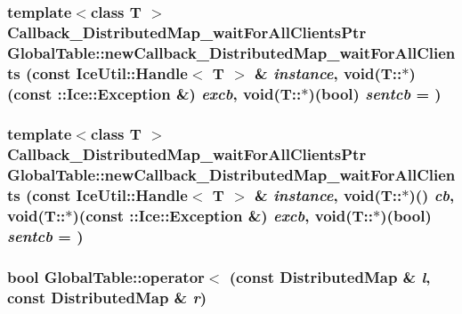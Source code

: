 \label{namespace_global_table_ac9ffe632ea55c9e7441c89ffc0d325c8}
\hypertarget{namespace_global_table_a7934bc48a6767947eeee537bedd34483}{
\subsubsection[{newCallback\_\-DistributedMap\_\-waitForAllClients}]{\setlength{\rightskip}{0pt plus 5cm}template$<$class T $>$ {\bf Callback\_\-DistributedMap\_\-waitForAllClientsPtr} GlobalTable::newCallback\_\-DistributedMap\_\-waitForAllClients (const IceUtil::Handle$<$ T $>$ \& {\em instance}, \/  void(T::$\ast$)(const ::Ice::Exception \&) {\em excb}, \/  void(T::$\ast$)(bool) {\em sentcb} = {})}}
\label{namespace_global_table_a7934bc48a6767947eeee537bedd34483}
\hypertarget{namespace_global_table_aa5ce29646d387a4a3eb4591eb1aa1bbf}{
\subsubsection[{newCallback\_\-DistributedMap\_\-waitForAllClients}]{\setlength{\rightskip}{0pt plus 5cm}template$<$class T $>$ {\bf Callback\_\-DistributedMap\_\-waitForAllClientsPtr} GlobalTable::newCallback\_\-DistributedMap\_\-waitForAllClients (const IceUtil::Handle$<$ T $>$ \& {\em instance}, \/  void(T::$\ast$)() {\em cb}, \/  void(T::$\ast$)(const ::Ice::Exception \&) {\em excb}, \/  void(T::$\ast$)(bool) {\em sentcb} = {})}}
\label{namespace_global_table_aa5ce29646d387a4a3eb4591eb1aa1bbf}
\hypertarget{namespace_global_table_ac8a24b85b1754afdfff19e408825f22c}{
\subsubsection[{operator$<$}]{\setlength{\rightskip}{0pt plus 5cm}bool GlobalTable::operator$<$ (const DistributedMap \& {\em l}, \/  const DistributedMap \& {\em r})}}
